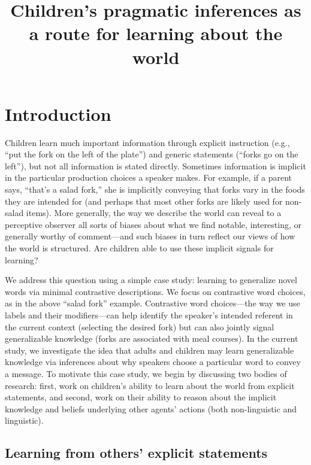 \documentclass[man]{apa2}
\title{Children's pragmatic inferences as a route for learning about the world}
\begin{document}
\maketitle                            


\section{Introduction}

Children learn much important information through explicit instruction (e.g., ``put the fork on the left of the plate'') and generic statements (``forks go on the left''), but not all information is stated directly. Sometimes information is implicit in the particular production choices a speaker makes. For example, if a parent says, ``that's a salad fork,'' she is implicitly conveying that forks vary in the foods they are intended for (and perhaps that most other forks are likely used for non-salad items). More generally, the way we describe the world can reveal to a perceptive observer all sorts of biases about what we find notable, interesting, or generally worthy of comment---and such biases in turn reflect our views of how the world is structured. Are children able to use these implicit signals for learning? 

We address this question using a simple case study: learning to generalize novel words via minimal contrastive descriptions.  We focus on contrastive word choices, as in the above ``salad fork'' example. Contrastive word choices---the way we use labels and their modifiers---can help identify the speaker's intended referent in the current context (selecting the desired fork) but can also jointly signal generalizable knowledge (forks are associated with meal courses). In the current study, we investigate the idea that adults and children may learn generalizable knowledge via inferences about why speakers choose a particular word to convey a message. To motivate this case study, we begin by discussing two bodies of research: first, work on children's ability to learn about the world from explicit statements, and second, work on their ability to reason about the implicit knowledge and beliefs underlying other agents' actions (both non-linguistic and linguistic). 


\subsection{Learning from others' explicit statements}
\end{document}
